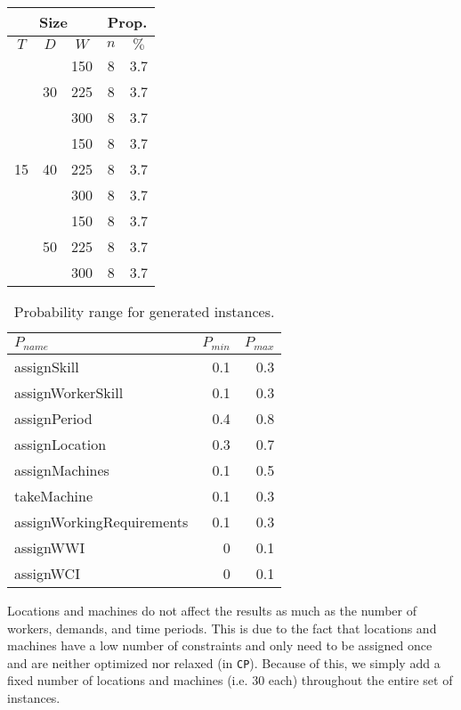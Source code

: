 \documentclass[../../thesis.tex]{subfiles}
\begin{document}
\begin{table}[H]
\begin{tabular}[t]{|c|c|c |c|c|}
    \hline
    \multicolumn{3}{|c|}{Size} & \multicolumn{2}{|c|}{Prop.} \\
    \hline 
    $T$ & $D$ & $W$ & $n$ & $\%$ \\
    \hline 
    \multirow{9}{*}{15} & \multirow{3}{*}{30} & 150 & 8 & 3.7 \\ 
    \cline{3-5}
     &  & 225 & 8 & 3.7 \\ 
     \cline{3-5}
     &  & 300 & 8 & 3.7 \\ 
     \cline{2-5}
     & \multirow{3}{*}{40} & 150 & 8 & 3.7 \\ 
     \cline{3-5}
     &  & 225 & 8 & 3.7 \\ 
     \cline{3-5}
     &  & 300 & 8 & 3.7 \\ 
     \cline{2-5}
     & \multirow{3}{*}{50} & 150 & 8 & 3.7 \\ 
     \cline{3-5}
     &  & 225 & 8 & 3.7 \\ 
     \cline{3-5}
     &  & 300 & 8 & 3.7 \\ 
    \hline
  \end{tabular}
\end{table}


\begin{table}[H]
  \caption{Probability range for generated instances.}
  \label{instances:probabilities}
  \centering
  \begin{tabular}[t]{|l r r|}
    \hline 
    $P_{name}$ & $P_{min}$ & $P_{max}$ \\
    \hline
    assignSkill & 0.1 & 0.3 \\
    assignWorkerSkill & 0.1 & 0.3 \\
    assignPeriod & 0.4 & 0.8 \\
    assignLocation & 0.3 & 0.7 \\
    assignMachines & 0.1 & 0.5 \\
    takeMachine & 0.1 & 0.3 \\
    assignWorkingRequirements & 0.1 & 0.3 \\
    assignWWI & 0 & 0.1 \\
    assignWCI & 0 & 0.1 \\
    \hline
  \end{tabular}
\end{table}

Locations and machines do not affect the results as much as the number of workers, demands, and time periods. This is due to the fact 
that locations and machines have a low number of constraints and only need to be assigned once and are neither optimized nor relaxed (in \texttt{CP}). 
Because of this, we simply add a fixed number of locations and machines (i.e. 30 each) throughout the entire set of instances.
\end{document}
